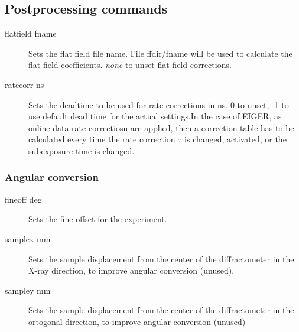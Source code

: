 \documentclass{article}
\newcommand{\E}{EIGER\xspace}
\begin{document}
\subsection{Postprocessing commands}
\begin{description}      
\item[flatfield fname] Sets the flat field file name. File ffdir/fname will be used to calculate the flat field coefficients. \textit{none} to unset flat field corrections. 
\item[ratecorr ns] Sets the deadtime to be used for rate corrections in ns. 0 to unset, -1 to use default dead time for the actual settings.In the case of \E, as online data rate correctiosn are applied, then a correction table has to be calculated every time the rate correction  $\tau$ is changed, activated, or the subexposure time is changed.
 
\end{description}

\subsubsection{Angular conversion}

\begin{description}
\item[fineoff deg] Sets the fine offset for the experiment.
\item[samplex mm] Sets the sample displacement from the center of the diffractometer in the X-ray direction, to improve angular conversion (unused).
\item[sampley mm] Sets the sample displacement from the center of the diffractometer in the ortogonal direction, to improve angular conversion (unused)
\end{description}
\end{document}
